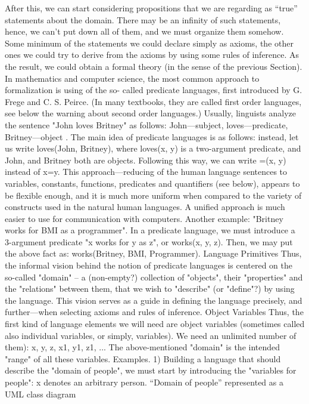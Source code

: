 After this, we can start considering propositions that we are regarding as ``true'' statements about the
domain. There may be an infinity of such statements, hence, we can't put down all of them, and we must
organize them somehow. Some minimum of the statements we could declare simply as axioms, the other
ones we could try to derive from the axioms by using some rules of inference.
As the result, we could obtain a formal theory (in the sense of the previous Section).
In mathematics and computer science, the most common approach to formalization is using of the so-
called predicate languages, first introduced by G. Frege and C. S. Peirce.
(In many textbooks, they are called first order languages, see below the warning about second order languages.)
Usually, linguists analyze the sentence "John loves Britney" as follows: John---subject, loves---predicate,
Britney---object . The main idea of predicate languages is as follows: instead, let us write loves(John,
Britney), where loves(x, y) is a two-argument predicate, and John, and Britney both are objects. Following
this way, we can write =(x, y) instead of x=y. This approach---reducing of the human language sentences
to variables, constants, functions, predicates and quantifiers (see below), appears to be flexible enough,
and it is much more uniform when compared to the variety of constructs used in the natural human
languages. A unified approach is much easier to use for communication with computers.
Another example: "Britney works for BMI as a programmer". In a predicate language, we must introduce a 3-argument
predicate "x works for y as z", or works(x, y, z). Then, we may put the above fact as: works(Britney, BMI, Programmer).
Language Primitives
Thus, the informal vision behind the notion of predicate languages is centered on the so-called "domain"
– a (non-empty?) collection of "objects", their "properties" and the "relations" between them, that we wish
to "describe" (or "define"?) by using the language. This vision serves as a guide in defining the language
precisely, and further---when selecting axioms and rules of inference.
Object Variables
Thus, the first kind of language elements we will need are object variables (sometimes called also
individual variables, or simply, variables). We need an unlimited number of them):
x, y, z, x1, y1, z1, ...
The above-mentioned "domain" is the intended "range" of all these variables.
Examples. 1) Building a language that should describe the "domain of people", we must start by introducing the "variables for
people": x denotes an arbitrary person.
``Domain of people'' represented as a UML class diagram
